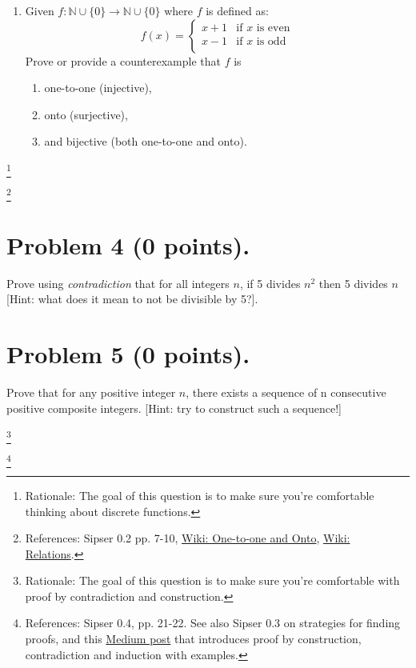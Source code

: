 \documentclass[letterpaper,11pt,twoside]{article}
\theoremstyle{plain}
\theoremstyle{definition}
\theoremstyle{remark}
\theoremstyle{restate}
\newcommand\blfootnote[1]{%
  \begingroup
  \renewcommand\thefootnote{}\footnote{#1}%
  \addtocounter{footnote}{-1}%
  \endgroup
}
\begin{document}
\begin{enumerate}
    \item Given $f:\mathbb{N} \cup \{0\} \rightarrow \mathbb{N} \cup \{0\}$ where $f$ is defined as: \\
    \[
        f(x)=
        \begin{cases}
        x+1 & \text{if } x \text{ is even} \\
        x-1 & \text{if } x \text{ is odd} \\
        \end{cases}
    \]
    Prove or provide a counterexample that $f$ is 
    \begin{enumerate}
        \item one-to-one (injective),
        \item onto (surjective),
        \item and bijective (both one-to-one and onto).
        
    \end{enumerate}
\end{enumerate}

\blfootnote{ Rationale: The goal of this question is to make sure you're comfortable thinking about discrete functions. }
\blfootnote{ References: Sipser 0.2 pp. 7-10, \href{https://en.wikipedia.org/wiki/Injective_function}{Wiki: One-to-one and Onto}, \href{https://en.wikipedia.org/wiki/Relation_(mathematics)}{Wiki: Relations}.}







\clearpage
\section{Problem 4 (0 points). }

Prove using \emph{contradiction} that for all integers $n$, if 5 divides $n^2$ then 5 divides $n$ [Hint: what does it mean to not be divisible by 5?]. 

\section{Problem 5 (0 points).}

Prove that for any positive integer $n$, there exists a sequence of n consecutive positive composite integers. [Hint: try to construct such a sequence!]

\blfootnote{ Rationale: The goal of this question is to make sure you're comfortable with proof by contradiction and construction. }
\blfootnote{ References: Sipser 0.4, pp. 21-22. See also Sipser 0.3 on strategies for finding proofs, and this \href{https://medium.com/@nissim.lavy/types-of-proofs-c43ffacc8ada}{Medium post} that introduces proof by construction, contradiction and induction with examples. }
\end{document}
